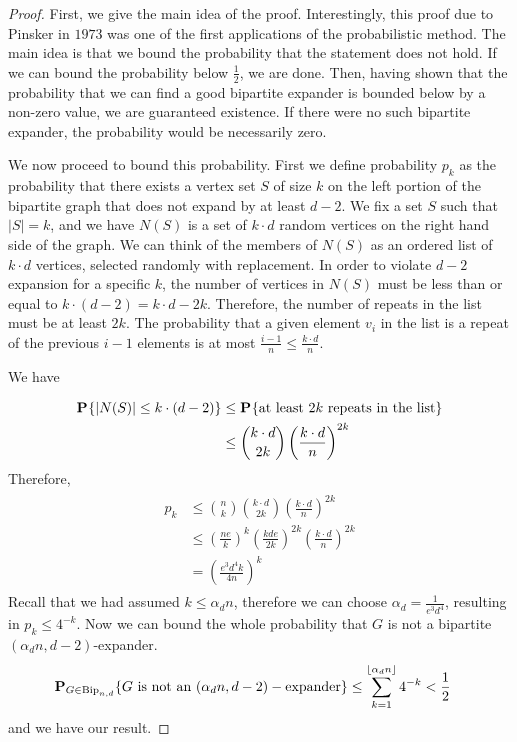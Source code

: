 \documentclass[11pt]{article}
\theoremstyle{definition}
\theoremstyle{definition}
\theoremstyle{definition}
\newcommand{\txt}[1]
{\textnormal{#1}}
\newcommand{\prob}[2]
{\textbf{P}_{#1}\{{#2}\}}
\begin{document}
\begin{proof}
First, we give the main idea of the proof. Interestingly, this proof due to Pinsker in $1973$ was one of the first applications of the probabilistic method. The main idea is that we bound the probability that the statement does not hold. If we can bound the probability below $\frac{1}{2}$, we are done. Then, having shown that the probability that we can find a good bipartite expander is bounded below by a non-zero value, we are guaranteed existence. If there were no such bipartite expander, the probability would be necessarily zero. 

We now proceed to bound this probability. First we define probability $p_k$ as the probability that there exists a vertex set $S$ of size $k$ on the left portion of the bipartite graph that does not expand by at least $d - 2$. We fix a set $S$ such that $|S| = k$, and we have $N(S)$ is a set of $k\cdot d$ random vertices on the right hand side of the graph. We can think of the members of $N(S)$ as an ordered list of $k\cdot d$ vertices, selected randomly with replacement. In order to violate $d - 2$ expansion for a specific $k$, the number of vertices in $N(S)$ must be less than or equal to $k\cdot(d -2) = k\cdot d - 2k$. Therefore, the number of repeats in the list must be at least $2k$. The probability that a given element $v_i$ in the list is a repeat of the previous $i - 1$ elements is at most $\frac{i - 1}{n} \leq \frac{k\cdot d}{n}$. 

We have 

\begin{align}
\begin{split}
\prob{}{|N(S)| \leq k \cdot (d - 2)} &\leq \prob{}{\txt{at least } 2k\txt{ repeats in the list}}
\\
&\leq {k\cdot d \choose 2k}\left(\frac{k\cdot d}{n}\right)^{2k}
\end{split}
\end{align}
Therefore, 
\begin{align}
\begin{split}
p_k &\leq {n \choose k}{k\cdot d \choose 2k}\left(\frac{k\cdot d}{n}\right)^{2k}
\\
&\leq \left(\frac{ne}{k}\right)^{k} \left(\frac{kde}{2k}\right)^{2k}\left(\frac{k\cdot d}{n}\right)^{2k}
\\
&= \left(\frac{e^3 d^4 k}{4n}\right)^{k}
\end{split}
\end{align}
Recall that we had assumed $k \leq \alpha_d n$, therefore we can choose $\alpha_d = \frac{1}{e^3d^4}$, resulting in $p_k \leq 4^{-k}$. 
Now we can bound the whole probability that $G$ is not a bipartite $(\alpha_d n, d - 2)$-expander. 
\begin{align}
\begin{split}
\prob{G \in \txt{Bip}_{n, d}}{G \txt{ is not an }(\alpha_d n, d - 2)-\txt{expander}} &\leq \sum_{k = 1}^{\lfloor \alpha_d n \rfloor} 4^{-k} < \frac{1}{2}
\end{split}
\end{align}
and we have our result.
\end{proof}
\end{document}
